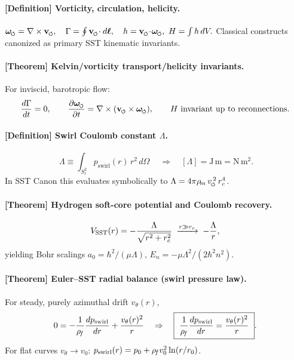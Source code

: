 \documentclass[11pt]{article}
\begin{document}
    \paragraph{[Definition] Vorticity, circulation, helicity.}
    \(\omegas=\nabla\times \vswirl,\quad \Gamma=\oint \vswirl\!\cdot d\boldsymbol{\ell},\quad h=\vswirl\!\cdot\!\omegas,\ H=\int h\,dV.\)
    Classical constructs canonized as primary SST kinematic invariants.

    \paragraph{[Theorem] Kelvin/vorticity transport/helicity invariants.}
    For inviscid, barotropic flow:
    \[
        \frac{d\Gamma}{dt}=0,\qquad
        \pdv{\omegas}{t}=\nabla\times(\vswirl\times\omegas),\qquad
        \text{$H$ invariant up to reconnections}.
    \]

    \paragraph{[Definition] Swirl Coulomb constant \(\Lambda\).}
    \[
        \boxed{\ \Lambda \equiv \int_{S_r^2} p_{\text{swirl}}(r)\, r^2\, d\Omega\ } \quad\Rightarrow\quad [\Lambda]=\mathrm{J\,m}=\mathrm{N\,m^2}.
    \]
    In SST Canon this evaluates symbolically to \( \Lambda=4\pi \rhom\, \vscore^{\,2}\, \rc^4\).

    \paragraph{[Theorem] Hydrogen soft-core potential and Coulomb recovery.}
    \[
        V_{\text{SST}}(r)=-\frac{\Lambda}{\sqrt{r^2+r_c^2}}
        \;\xrightarrow{r\gg r_c}\;
        -\frac{\Lambda}{r},
    \]
    yielding Bohr scalings
    \(a_0=\hbar^2/(\mu\Lambda)\), \(E_n=-\mu\Lambda^2/(2\hbar^2 n^2)\).

    \paragraph{[Theorem] Euler–SST radial balance (swirl pressure law).}
    For steady, purely azimuthal drift \(v_\theta(r)\),
    \[
        0=-\frac{1}{\rhof}\frac{dp_{\text{swirl}}}{dr}+\frac{v_\theta(r)^2}{r}
        \quad\Rightarrow\quad
        \boxed{\ \frac{1}{\rhof}\frac{dp_{\text{swirl}}}{dr}=\frac{v_\theta(r)^2}{r}\ }.
    \]
    For flat curves \(v_\theta\to v_0\): \(p_{\text{swirl}}(r)=p_0+\rho_{\!f} v_0^2 \ln(r/r_0)\).
\end{document}
